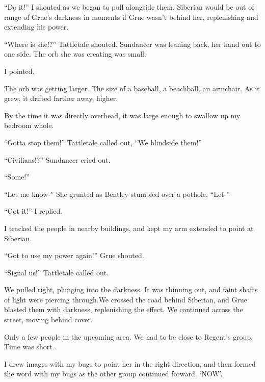 ``Do it!''  I shouted as we began to pull alongside them.  Siberian would be out of range of Grue's darkness in moments if Grue wasn't behind her, replenishing and extending his power.



``Where is she!?''  Tattletale shouted.  Sundancer was leaning back, her hand out to one side.  The orb she was creating was small.



I pointed.



The orb was getting larger.  The size of a baseball, a beachball, an armchair.  As it grew, it drifted farther away, higher.



By the time it was directly overhead, it was large enough to swallow up my bedroom whole.



``Gotta stop them!''  Tattletale called out, ``We blindside them!''



``Civilians!?''  Sundancer cried out.



``Some!''



``Let me know-''  She grunted as Bentley stumbled over a pothole.  ``Let-''



``Got it!''  I replied.



I tracked the people in nearby buildings, and kept my arm extended to point at Siberian.



``Got to use my power again!''  Grue shouted.



``Signal us!''  Tattletale called out.



We pulled right, plunging into the darkness.  It was thinning out, and faint shafts of light were piercing through.We crossed the road behind Siberian, and Grue blasted them with darkness, replenishing the effect.  We continued across the street, moving behind cover.



Only a few people in the upcoming area.  We had to be close to Regent's group.  Time was short.



I drew images with my bugs to point her in the right direction, and then formed the word with my bugs as the other group continued forward.  `NOW'.




